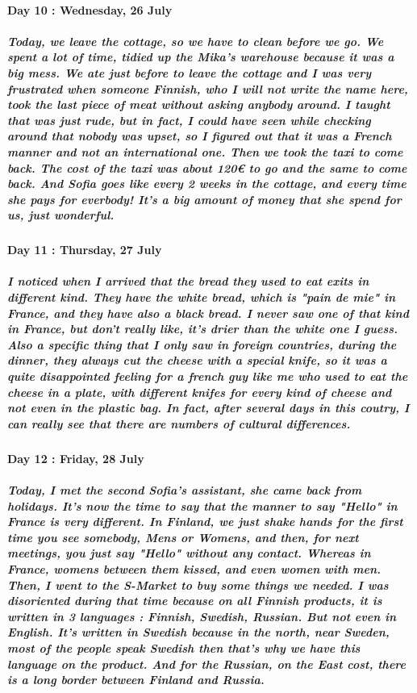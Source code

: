 \documentclass[a4paper,12pt]{report} %
\begin{document}
\paragraph{Day 10 : Wednesday, 26 July}
\subparagraph{Today, we leave the cottage, so we have to clean before we go. We spent a lot of time, tidied up the Mika's warehouse because it was a big mess. We ate just before to leave the cottage and I was very frustrated when someone Finnish, who I will not write the name here, took the last piece of meat without asking anybody around. I taught that was just rude, but in fact, I could have seen while checking around that nobody was upset, so I figured out that it was a French manner and not an international one. Then we took the taxi to come back. The cost of the taxi was about 120€ to go and the same to come back. And Sofia goes like every 2 weeks in the cottage, and every time she pays for everbody! It's a big amount of money that she spend for us, just wonderful.}

\paragraph{Day 11 : Thursday, 27 July}
\subparagraph{I noticed when I arrived that the bread they used to eat exits in different kind. They have the white bread, which is "pain de mie" in France, and they have also a black bread. I never saw one of that kind in France, but don't really like, it's drier than the white one I guess. Also a specific thing that I only saw in foreign countries, during the dinner, they always cut the cheese with a special knife, so it was a quite disappointed feeling for a french guy like me who used to eat the cheese in a plate, with different knifes for every kind of cheese and not even in the plastic bag. In fact, after several days in this coutry, I can really see that there are numbers of cultural differences.}

\paragraph{Day 12 : Friday, 28 July}
\subparagraph{Today, I met the second Sofia's assistant, she came back from holidays. It's now the time to say that the manner to say "Hello" in France is very different. In Finland, we just shake hands for the first time you see somebody, Mens or Womens, and then, for next meetings, you just say "Hello" without any contact. Whereas in France, womens between them kissed, and even women with men. Then, I went to the S-Market to buy some things we needed. I was disoriented during that time because on all Finnish products, it is written in 3 languages : Finnish, Swedish, Russian. But not even in English. It's written in Swedish because in the north, near Sweden, most of the people speak Swedish then that's why we have this language on the product. And for the Russian, on the East cost, there is a long border between Finland and Russia.}
\end{document}
